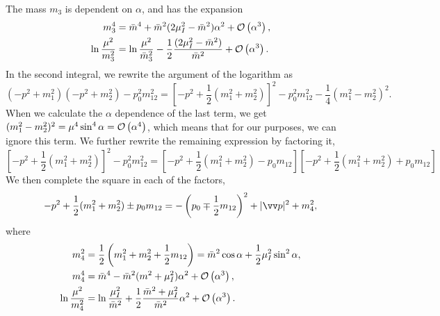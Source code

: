 The mass $m_3$ is dependent on $\alpha$, and has the expansion
\begin{align*}
    m_3^4
    &= \bar m^4 + \bar m^2(2\mu_I^2 - \bar m^2)\alpha^2+ \Oh[3]{\alpha}, \\
    \ln \frac{\mu^2}{m_3^2}
    &=
    \ln \frac{\mu^2}{\bar m_3^2} - \frac{1}{2} \frac{(2\mu_I^2 - \bar m^2)}{\bar m^2}+ \Oh[3]{\alpha}.
\end{align*}
In the second integral, we rewrite the argument of the logarithm as
\begin{equation}
    (-p^2 + m_1^2)(-p^2 + m_2^2) - p_0^2 m_{12}^2
    =  \left[-p^2 + \frac{1}{2}(m_1^2 + m_2^2)\right]^2 - p_0^2 m_{12}^2 - \frac{1}{4}(m_1^2 - m_2^2)^2.
\end{equation}
When we calculate the $\alpha$ dependence of the last term, we get  $(m_1^2 - m_2^2)^2 = \mu^4 \sin^4\alpha = \Oh[4]{\alpha}$, which means that for our purposes, we can ignore this term.
We further rewrite the remaining expression by factoring it,
\begin{equation}
    \left[-p^2 + \frac{1}{2}(m_1^2 + m_2^2)\right]^2 - p_0^2 m_{12}^2
    = \left[-p^2 + \frac{1}{2}(m_1^2 + m_2^2) - p_0 m_{12} \right]
    \left[-p^2 + \frac{1}{2}(m_1^2 + m_2^2) + p_0 m_{12} \right]
\end{equation}
We then complete the square in each of the factors,
\begin{equation}
    - p^2 + \frac{1}{2}(m_1^2 + m_2^2) \pm p_0 m_{12}
    = - \left(p_0 \mp \frac{1}{2}m_{12}\right)^2 + |\vv p|^2 + m_4^2,
\end{equation}
where
\begin{align}
    m_4^2 &= \frac{1}{2}\left(m_1^2 +m_2^2 +\frac{1}{2}m_{12}\right)
    = \bar m^2 \cos\alpha + \frac{1}{2} \mu_I^2 \sin^2 \alpha, \\
    m_4^4
    &= \bar m^4 - \bar m^2(m^2 + \mu_I^2) \alpha^2 + \Oh[3]{\alpha}, \\
    \ln \frac{\mu^2}{m_4^2} 
    &= \ln \frac{\mu_I^2}{\bar m^2} + \frac{1}{2}\frac{\bar m^2 + \mu_I^2}{\bar m^2}\alpha^2
    + \Oh[3]{\alpha}.
\end{align}
